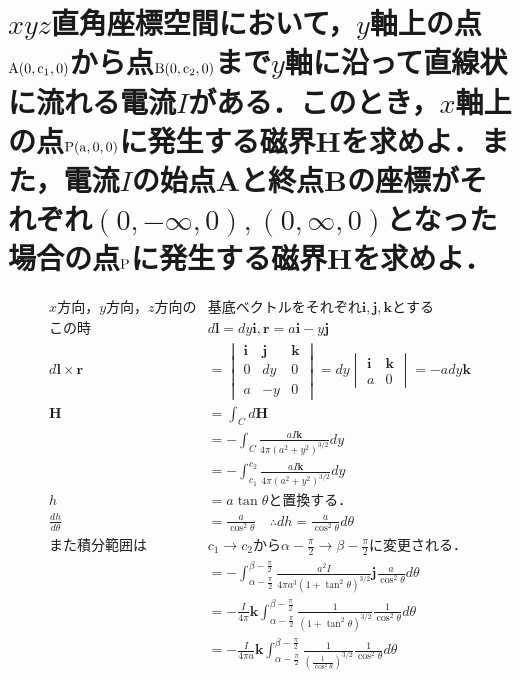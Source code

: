\documentclass[dvipdfmx]{ujarticle}
\begin{document}
\section{$xyz$直角座標空間において，$y$軸上の点$\rm{A}(0, c_{1}, 0)$から点$\rm{B}(0, c_{2}, 0)$まで$y$軸に沿って直線状に流れる電流$I$がある．このとき，$x$軸上の点$\rm{P}(a, 0, 0)$に発生する磁界$\boldsymbol{H}$を求めよ．また，電流$I$の始点Aと終点Bの座標がそれぞれ$(0, -\infty, 0), (0, \infty, 0)$となった場合の点$\rm{P}$に発生する磁界$\boldsymbol{H}$を求めよ．}
	\begin{align*}
	x方向，y方向，z方向の&基底ベクトルをそれぞれ\boldsymbol{i},\boldsymbol{j},\boldsymbol{k}とする\\
	この時&d\boldsymbol{l}=dy\boldsymbol{i}, \boldsymbol{r}=a\boldsymbol{i}-y\boldsymbol{j}\\
	d\boldsymbol{l}\times \boldsymbol{r}&=
	\begin{vmatrix}
	\boldsymbol{i} & \boldsymbol{j} & \boldsymbol{k}\\
	0 &dy & 0\\
	a & -y &0
	\end{vmatrix}
	=dy
	\begin{vmatrix}
	\boldsymbol{i}  & \boldsymbol{k}\\
	a & 0
	\end{vmatrix}
	=-ady\boldsymbol{k}\\
	\boldsymbol{H}&=\int_{C} d\boldsymbol{H}\\
	&=-\int_{C} \frac{aI\boldsymbol{k}}{4\pi(a^{2}+y^{2})^{3/2}}dy\\
	&=-\int_{c_{1}}^{c_{2}} \frac{aI\boldsymbol{k}}{4\pi(a^{2}+y^{2})^{3/2}}dy\\
	h&=a\tan \theta と置換する．\\
	\frac{dh}{d\theta}&=\frac{a}{\cos ^{2}\theta } \quad \therefore dh=\frac{a}{\cos ^{2}\theta }d\theta \\
	また積分範囲は&c_{1}\to c_{2}から\alpha-\frac{\pi}{2} \to \beta -\frac{\pi}{2}に変更される．\\
	&=-\int_{\alpha-\frac{\pi}{2}}^{\beta -\frac{\pi}{2}} \frac{a^{2}I}{4\pi a^{3}(1+\tan^{2}\theta)^{3/2}}\boldsymbol{j} \frac{a}{\cos ^{2}\theta }d\theta\\
	&=-\frac{I}{4\pi} \boldsymbol{k} \int_{\alpha-\frac{\pi}{2}}^{\beta -\frac{\pi}{2}} \frac{1}{(1+\tan^{2}\theta)^{3/2}} \frac{1}{\cos ^{2}\theta }d\theta\\
	&=-\frac{I}{4\pi a} \boldsymbol{k} \int_{\alpha-\frac{\pi}{2}}^{\beta -\frac{\pi}{2}} \frac{1}{(\frac{1}{\cos^{2} \theta })^{3/2}} \frac{1}{\cos ^{2}\theta }d\theta\\

\end{align*}
\end{document}
